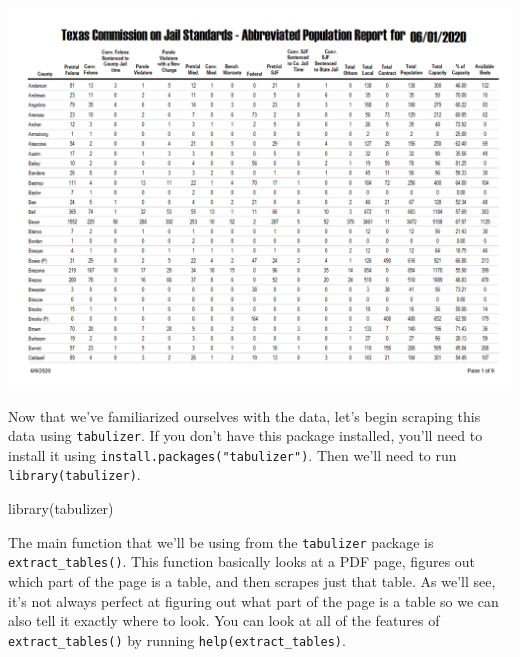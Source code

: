 \documentclass[
]{krantz}
\makeatletter
\newenvironment{Shaded}{\begin{snugshade}}{\end{snugshade}}
\newcommand{\FunctionTok}[1]{\textcolor[rgb]{0,0,0}{#1}}
\newcommand{\NormalTok}[1]{#1}
\newenvironment{kframe}{%
\medskip{}
\setlength{\fboxsep}{.8em}
 \def\at@end@of@kframe{}%
 \ifinner\ifhmode%
  \def\at@end@of@kframe{\end{minipage}}%
  \begin{minipage}{\columnwidth}%
 \fi\fi%
 \def\FrameCommand##1{\hskip\@totalleftmargin \hskip-\fboxsep
 \colorbox{shadecolor}{##1}\hskip-\fboxsep
     \hskip-\linewidth \hskip-\@totalleftmargin \hskip\columnwidth}%
 \MakeFramed {\advance\hsize-\width
   \@totalleftmargin\z@ \linewidth\hsize
   \@setminipage}}%
 {\par\unskip\endMakeFramed%
 \at@end@of@kframe}
\renewenvironment{Shaded}{\begin{kframe}}{\end{kframe}}
\makeatother
\begin{document}
\includegraphics{images/tabulizer1.PNG}

Now that we've familiarized ourselves with the data, let's begin scraping this data using \texttt{tabulizer}. If you don't have this package installed, you'll need to install it using \texttt{install.packages("tabulizer")}. Then we'll need to run \texttt{library(tabulizer)}.

\begin{Shaded}
\begin{Highlighting}[]
\FunctionTok{library}\NormalTok{(tabulizer)}
\end{Highlighting}
\end{Shaded}

The main function that we'll be using from the \texttt{tabulizer} package is \texttt{extract\_tables()}. This function basically looks at a PDF page, figures out which part of the page is a table, and then scrapes just that table. As we'll see, it's not always perfect at figuring out what part of the page is a table so we can also tell it exactly where to look. You can look at all of the features of \texttt{extract\_tables()} by running \texttt{help(extract\_tables)}.
\end{document}
